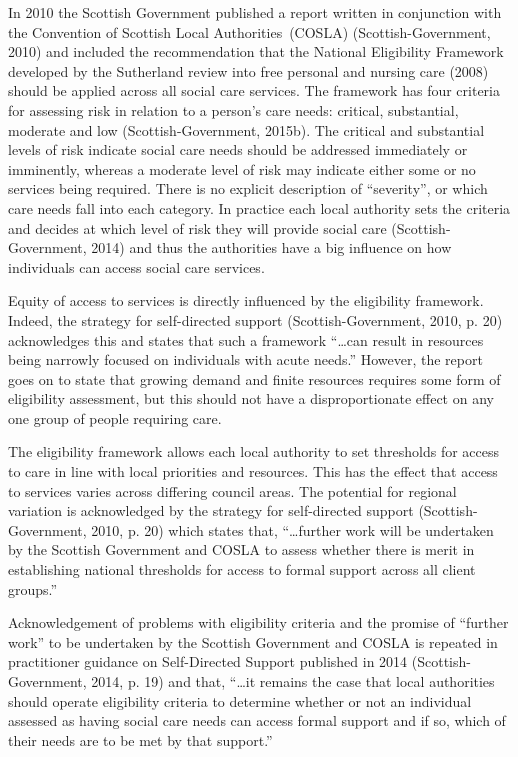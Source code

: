 \documentclass[12pt,a4paper,oneside,table]{report}
\begin{document}
In 2010 the Scottish Government published a report written in
conjunction with the Convention of Scottish Local Authorities~(COSLA)
(Scottish-Government, 2010) and included the recommendation that the
National Eligibility Framework developed by the Sutherland review into
free personal and nursing care (2008) should be applied across all
social care services. The framework has four criteria for assessing risk
in relation to a person's care needs: critical, substantial, moderate
and low (Scottish-Government, 2015b). The critical and substantial
levels of risk indicate social care needs should be addressed
immediately or imminently, whereas a moderate level of risk may indicate
either some or no services being required. There is no explicit
description of ``severity'', or which care needs fall into each
category. In practice each local authority sets the criteria and decides
at which level of risk they will provide social care
(Scottish-Government, 2014) and thus the authorities have a big
influence on how individuals can access social care services.

Equity of access to services is directly influenced by the eligibility
framework. Indeed, the strategy for self-directed support
(Scottish-Government, 2010, p. 20) acknowledges this and states that
such a framework ``\ldots{}can result in resources being narrowly
focused on individuals with acute needs.'' However, the report goes on
to state that growing demand and finite resources requires some form of
eligibility assessment, but this should not have a disproportionate
effect on any one group of people requiring care.

The eligibility framework allows each local authority to set thresholds
for access to care in line with local priorities and resources. This has
the effect that access to services varies across differing council
areas. The potential for regional variation is acknowledged by the
strategy for self-directed support (Scottish-Government, 2010, p. 20)
which states that, ``\ldots{}further work will be undertaken by the
Scottish Government and COSLA to assess whether there is merit in
establishing national thresholds for access to formal support across all
client groups.''

Acknowledgement of problems with eligibility criteria and the promise of
``further work'' to be undertaken by the Scottish Government and COSLA
is repeated in practitioner guidance on Self-Directed Support published
in 2014 (Scottish-Government, 2014, p. 19) and that, ``\ldots{}it
remains the case that local authorities should operate eligibility
criteria to determine whether or not an individual assessed as having
social care needs can access formal support and if so, which of their
needs are to be met by that support.''
\end{document}
